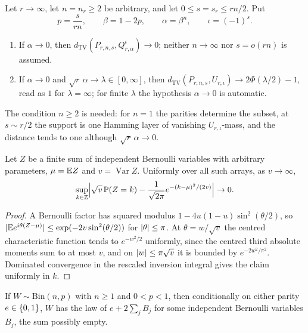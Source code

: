 \begin{theorem}\label{prd:thm:parity}
Let $r\to\infty$, let $n=n_r\ge2$ be arbitrary, and let $0\le s=s_r\le rn/2$. Put
\[
 p=\frac s{rn},\qquad\beta=1-2p,\qquad\alpha=\beta^n,\qquad\iota=(-1)^s .
\]
\begin{enumerate}[label=\textup{(\roman*)}]
\item If $\alpha\to0$, then $d_{\mathrm{TV}}(P_{r,n,s},Q_{r,\alpha}^\iota)\to0$; neither $n\to\infty$ nor
$s=o(rn)$ is assumed.
\item If $\alpha\to0$ and $\sqrt r\,\alpha\to\lambda\in[0,\infty]$, then
$d_{\mathrm{TV}}(P_{r,n,s},U_{r,\iota})\to2\Phi(\lambda/2)-1$, read as $1$ for $\lambda=\infty$; for finite $\lambda$
the hypothesis $\alpha\to0$ is automatic.
\end{enumerate}
\end{theorem}

The condition $n\ge2$ is needed: for $n=1$ the parities determine the subset, at $s\sim r/2$ the support is one
Hamming layer of vanishing $U_{r,\iota}$-mass, and the distance tends to one although $\sqrt r\,\alpha\to0$.

\begin{lemma}\label{prd:lem:llt}
Let $Z$ be a finite sum of independent Bernoulli variables with arbitrary parameters, $\mu=\mathbb{E} Z$ and
$v=\operatorname{Var}Z$. Uniformly over all such arrays, as $v\to\infty$,
\[
 \sup_{k\in\mathbb{Z}}\Bigl|\sqrt v\,\mathbb{P}(Z=k)-\frac1{\sqrt{2\pi}}e^{-(k-\mu)^2/(2v)}\Bigr|\to0 .
\]
\end{lemma}

\begin{proof}
A Bernoulli factor has squared modulus $1-4u(1-u)\sin^2(\theta/2)$, so
$\lvert\mathbb{E} e^{i\theta(Z-\mu)}\rvert\le\exp(-2v\sin^2(\theta/2))$ for $\lvert\theta\rvert\le\pi$. At $\theta=w/\sqrt v$ the centred
characteristic function tends to $e^{-w^2/2}$ uniformly, since the centred third absolute moments sum to at most
$v$, and on $\lvert w\rvert\le\pi\sqrt v$ it is bounded by $e^{-2w^2/\pi^2}$. Dominated convergence in the rescaled inversion
integral gives the claim uniformly in $k$.
\end{proof}

\begin{lemma}\label{prd:lem:parityroots}
If $W\sim\mathrm{Bin}(n,p)$ with $n\ge1$ and $0<p<1$, then conditionally on either parity $e\in\{0,1\}$, $W$ has the
law of $e+2\sum_jB_j$ for some independent Bernoulli variables $B_j$, the sum possibly empty.
\end{lemma}

